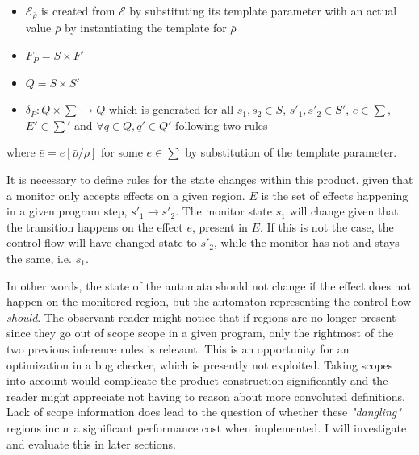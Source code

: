 \begin{itemize}
    \item $\mathcal{E}_{\bar{\rho}}$ is created from $\mathcal{E}$ by substituting its template parameter with an actual value $\bar{\rho}$ by instantiating the template for $\bar{\rho}$
    \item $F_P = S \times F'$
    \item $Q = S \times S'$
    \item $\delta_P : Q \times \sum \rightarrow Q$ which is generated for all $s_1, s_2 \in S$, $s'_1, s'_2 \in S'$, $e \in \sum$, $E' \in \sum'$ and $\forall q \in Q , q' \in Q'$ following two rules
\end{itemize}
    
\begin{center}
    \begin{prooftree}
    \end{prooftree}
    \hspace{2cm}
    \begin{prooftree}
    \end{prooftree}
\end{center}

\noindent where $\bar{e} = e [\bar{\rho}/\rho]$ for some $e \in \sum$ by substitution of the template parameter. 
    
\newpar It is necessary to define rules for the state changes within this product, given that a monitor only accepts effects on a given region. $E$ is the set of effects happening in a given program step, $s'_1 \rightarrow s'_2$. The monitor state $s_1$ will change given that the transition happens on the effect $e$, present in $E$. If this is not the case, the control flow will have changed state to $s'_2$, while the monitor has not and stays the same, i.e. $s_1$. 

\newpar In other words, the state of the automata should not change if the effect does not happen on the monitored region, but the automaton representing the control flow \textit{should}. The observant reader might notice that if regions are no longer present since they go out of scope scope in a given program, only the rightmost of the two previous inference rules is relevant. This is an opportunity for an optimization in a bug checker, which is presently not exploited. Taking scopes into account would complicate the product construction significantly and the reader might appreciate not having to reason about more convoluted definitions. Lack of scope information does lead to the question of whether these \textit{"dangling"} regions incur a significant performance cost when implemented. I will investigate and evaluate this in later sections.

